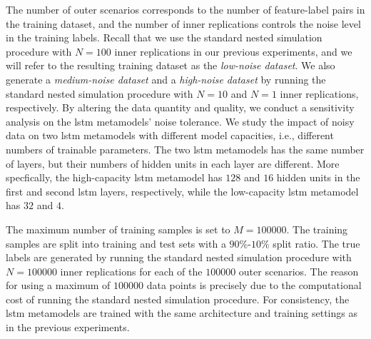 The number of outer scenarios corresponds to the number of feature-label pairs in the training dataset, and the number of inner replications controls the noise level in the training labels.
Recall that we use the standard nested simulation procedure with $N=100$ inner replications in our previous experiments, and we will refer to the resulting training dataset as the \textit{low-noise dataset}.
We also generate a \textit{medium-noise dataset} and a \textit{high-noise dataset} by running the standard nested simulation procedure with $N=10$ and $N=1$ inner replications, respectively.
By altering the data quantity and quality, we conduct a sensitivity analysis on the \gls{lstm} metamodels' noise tolerance.
We study the impact of noisy data on two \gls{lstm} metamodels with different model capacities, i.e., different numbers of trainable parameters.
The two \gls{lstm} metamodels has the same number of layers, but their numbers of hidden units in each layer are different.
More specfically, the high-capacity \gls{lstm} metamodel has $128$ and $16$ hidden units in the first and second \gls{lstm} layers, respectively, while the low-capacity \gls{lstm} metamodel has $32$ and $4$.

The maximum number of training samples is set to $M = \num{100000}$.
The training samples are split into training and test sets with a $90\%$-$10\%$ split ratio.
The true labels are generated by running the standard nested simulation procedure with $N=\num{100000}$ inner replications for each of the $\num{100000}$ outer scenarios.
The reason for using a maximum of $\num{100000}$ data points is precisely due to the computational cost of running the standard nested simulation procedure.
For consistency, the \gls{lstm} metamodels are trained with the same architecture and training settings as in the previous experiments.

